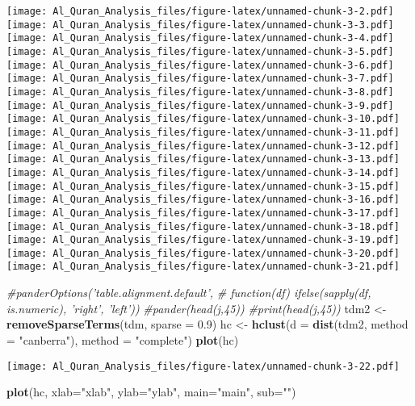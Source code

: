 \documentclass[]{article}
\newenvironment{Shaded}{\begin{snugshade}}{\end{snugshade}}
\newcommand{\CommentTok}[1]{\textcolor[rgb]{0.56,0.35,0.01}{\textit{#1}}}
\newcommand{\DataTypeTok}[1]{\textcolor[rgb]{0.13,0.29,0.53}{#1}}
\newcommand{\FloatTok}[1]{\textcolor[rgb]{0.00,0.00,0.81}{#1}}
\newcommand{\KeywordTok}[1]{\textcolor[rgb]{0.13,0.29,0.53}{\textbf{#1}}}
\newcommand{\NormalTok}[1]{#1}
\newcommand{\StringTok}[1]{\textcolor[rgb]{0.31,0.60,0.02}{#1}}
\begin{document}
\texttt{[image: Al\_Quran\_Analysis\_files/figure-latex/unnamed-chunk-3-2.pdf]}
\texttt{[image: Al\_Quran\_Analysis\_files/figure-latex/unnamed-chunk-3-3.pdf]}
\texttt{[image: Al\_Quran\_Analysis\_files/figure-latex/unnamed-chunk-3-4.pdf]}
\texttt{[image: Al\_Quran\_Analysis\_files/figure-latex/unnamed-chunk-3-5.pdf]}
\texttt{[image: Al\_Quran\_Analysis\_files/figure-latex/unnamed-chunk-3-6.pdf]}
\texttt{[image: Al\_Quran\_Analysis\_files/figure-latex/unnamed-chunk-3-7.pdf]}
\texttt{[image: Al\_Quran\_Analysis\_files/figure-latex/unnamed-chunk-3-8.pdf]}
\texttt{[image: Al\_Quran\_Analysis\_files/figure-latex/unnamed-chunk-3-9.pdf]}
\texttt{[image: Al\_Quran\_Analysis\_files/figure-latex/unnamed-chunk-3-10.pdf]}
\texttt{[image: Al\_Quran\_Analysis\_files/figure-latex/unnamed-chunk-3-11.pdf]}
\texttt{[image: Al\_Quran\_Analysis\_files/figure-latex/unnamed-chunk-3-12.pdf]}
\texttt{[image: Al\_Quran\_Analysis\_files/figure-latex/unnamed-chunk-3-13.pdf]}
\texttt{[image: Al\_Quran\_Analysis\_files/figure-latex/unnamed-chunk-3-14.pdf]}
\texttt{[image: Al\_Quran\_Analysis\_files/figure-latex/unnamed-chunk-3-15.pdf]}
\texttt{[image: Al\_Quran\_Analysis\_files/figure-latex/unnamed-chunk-3-16.pdf]}
\texttt{[image: Al\_Quran\_Analysis\_files/figure-latex/unnamed-chunk-3-17.pdf]}
\texttt{[image: Al\_Quran\_Analysis\_files/figure-latex/unnamed-chunk-3-18.pdf]}
\texttt{[image: Al\_Quran\_Analysis\_files/figure-latex/unnamed-chunk-3-19.pdf]}
\texttt{[image: Al\_Quran\_Analysis\_files/figure-latex/unnamed-chunk-3-20.pdf]}
\texttt{[image: Al\_Quran\_Analysis\_files/figure-latex/unnamed-chunk-3-21.pdf]}

\begin{Shaded}
\begin{Highlighting}[]
\CommentTok{#panderOptions('table.alignment.default',}
\CommentTok{#     function(df) ifelse(sapply(df, is.numeric), 'right', 'left'))}
\CommentTok{#pander(head(j,45))}
\CommentTok{#print(head(j,45))}
\NormalTok{tdm2 <-}\StringTok{ }\KeywordTok{removeSparseTerms}\NormalTok{(tdm, }\DataTypeTok{sparse =} \FloatTok{0.9}\NormalTok{)}
\NormalTok{hc <-}\StringTok{ }\KeywordTok{hclust}\NormalTok{(}\DataTypeTok{d =} \KeywordTok{dist}\NormalTok{(tdm2, }\DataTypeTok{method =} \StringTok{"canberra"}\NormalTok{), }\DataTypeTok{method =} \StringTok{"complete"}\NormalTok{)}
\KeywordTok{plot}\NormalTok{(hc)}
\end{Highlighting}
\end{Shaded}

\texttt{[image: Al\_Quran\_Analysis\_files/figure-latex/unnamed-chunk-3-22.pdf]}

\begin{Shaded}
\begin{Highlighting}[]
\KeywordTok{plot}\NormalTok{(hc, }\DataTypeTok{xlab=}\StringTok{"xlab"}\NormalTok{, }\DataTypeTok{ylab=}\StringTok{"ylab"}\NormalTok{, }\DataTypeTok{main=}\StringTok{"main"}\NormalTok{, }\DataTypeTok{sub=}\StringTok{""}\NormalTok{)}
\end{Highlighting}
\end{Shaded}
\end{document}

